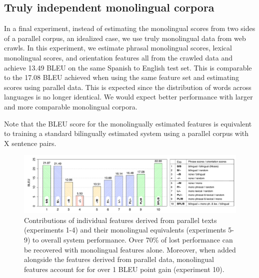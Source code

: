 \documentclass[11pt]{article}
\newcommand{\mnote}[1]{\marginpar{%
  \vskip-\baselineskip
  \raggedright\footnotesize
  \itshape\hrule\smallskip\tiny{#1}\par\smallskip\hrule}}
\newcommand{\mtodo}[1]{\mnote{\textcolor{red}{#1}}}
\begin{document}
\subsection{Truly independent monolingual corpora}
In a final experiment, instead of estimating the monolingual scores from two sides of a parallel corpus, an idealized case, we use truly monolingual data from web crawls. In this experiment, we estimate phrasal monolingual scores, lexical monolingual scores, and orientation features all from the crawled data and achieve 13.49 BLEU on the same Spanish to English test set. This is comparable to the 17.08 BLEU achieved when using the same feature set and estimating scores using parallel data. This is expected since the distribution of words across languages is no longer identical. We would expect better performance with larger and more comparable monolingual corpora.  %

 Note that the BLEU score for the monolingually estimated features is equivalent to training a standard bilingually estimated system using a parallel corpus with X sentence pairs.  \mtodo{Fill in from learning curve.}

\begin{figure}[t]
\begin{center}
\includegraphics[width=\linewidth]{../figures/lesionreplacement/lesionreplacementlegend.pdf}
\caption{Contributions of individual features derived from parallel texts (experiments 1-4) and their monolingual equivalents (experiments 5-9) to overall system performance.  Over 70\% of lost performance can be recovered with monolingual features alone.  Moreover, when added alongside the features derived from parallel data, monolingual features account for for over 1 BLEU point gain (experiment 10).}
\label{fig:lesionreplacement}
\end{center}
\vskip -0.2in
\end{figure}
\end{document}
